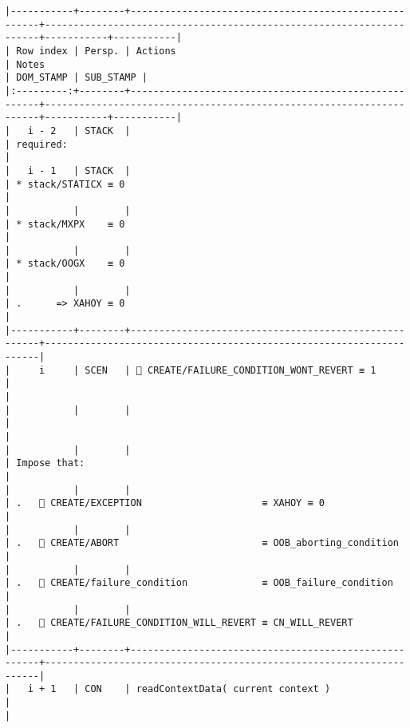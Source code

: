 \documentclass[varwidth=\maxdimen,margin=0.5cm,multi={verbatim}]{standalone}
\begin{document}
\begin{verbatim}
|-----------+--------+------------------------------------------------------+---------------------------------------------------------------------+-----------+-----------|
| Row index | Persp. | Actions                                              | Notes                                                               | DOM_STAMP | SUB_STAMP |
|:---------:+--------+------------------------------------------------------+---------------------------------------------------------------------+-----------+-----------|
|   i - 2   | STACK  |                                                      | required:                                                           |
|   i - 1   | STACK  |                                                      | * stack/STATICX ≡ 0                                                 |
|           |        |                                                      | * stack/MXPX    ≡ 0                                                 |
|           |        |                                                      | * stack/OOGX    ≡ 0                                                 |
|           |        |                                                      | .      => XAHOY ≡ 0                                                 |
|-----------+--------+------------------------------------------------------+---------------------------------------------------------------------|
|     i     | SCEN   |  CREATE/FAILURE_CONDITION_WONT_REVERT ≡ 1           |                                                                     |
|           |        |                                                      |                                                                     |
|           |        |                                                      | Impose that:                                                        |
|           |        |                                                      | .    CREATE/EXCEPTION                     ≡ XAHOY ≡ 0              |
|           |        |                                                      | .    CREATE/ABORT                         ≡ OOB_aborting_condition |
|           |        |                                                      | .    CREATE/failure_condition             ≡ OOB_failure_condition  |
|           |        |                                                      | .    CREATE/FAILURE_CONDITION_WILL_REVERT ≡ CN_WILL_REVERT         |
|-----------+--------+------------------------------------------------------+---------------------------------------------------------------------|
|   i + 1   | CON    | readContextData( current context )                   |                                                                     |

\end{verbatim}
\end{document}
